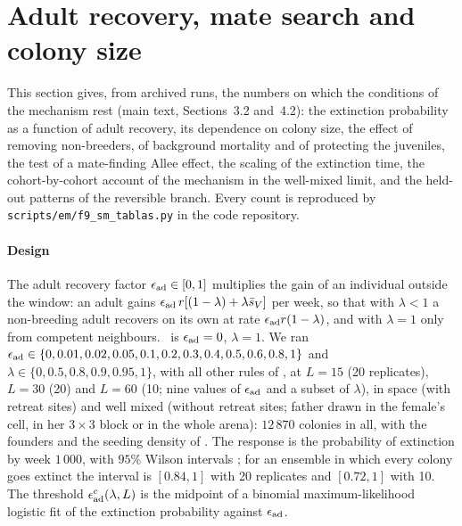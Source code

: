 \section{Adult recovery, mate search and colony size}
\label{supp:recovery}\label{sec:recovery}

This section gives, from archived runs, the numbers on which the
conditions of the mechanism rest (main text, Sections~3.2 and~4.2): the extinction probability as a function of adult
recovery, its dependence on colony size, the effect of removing non-breeders, of background mortality and of
protecting the juveniles, the test of a mate-finding Allee effect, the scaling of the extinction
time, the cohort-by-cohort account of the mechanism in the well-mixed limit, and the held-out patterns of the
reversible branch. Every count is reproduced by
\texttt{scripts/em/f9\_sm\_tablas.py} in the code repository.

\paragraph{Design}
The adult recovery factor $\epsilon_{\rm ad}\in[0,1]$ multiplies the gain of an individual outside the window: an adult gains
$\epsilon_{\rm ad}\,r[(1-\lambda)+\lambda\bar s_V]$ per week, so that with $\lambda<1$ a non-breeding adult recovers on its own
at rate $\epsilon_{\rm ad} r(1-\lambda)$, and with $\lambda=1$ only from competent neighbours. \Cone\ is $\epsilon_{\rm ad}=0$, $\lambda=1$.
We ran $\epsilon_{\rm ad}\in\{0,0.01,0.02,0.05,0.1,0.2,0.3,0.4,0.5,0.6,0.8,1\}$ and $\lambda\in\{0,0.5,0.8,0.9,0.95,1\}$, with
all other rules of \Cone, at $L=15$ (20 replicates), $L=30$ (20) and $L=60$ (10; nine values of $\epsilon_{\rm ad}$ and a
subset of $\lambda$), in space (with retreat sites) and well mixed (without retreat sites; father drawn in the
female's cell, in her $3\times3$ block or in the whole arena): $12\,870$ colonies in all, with the founders and the
seeding density of \Cone. The response is the probability of extinction by week $1\,000$, with $95\%$ Wilson
intervals \citep{Wilson1927}; for an ensemble in which every colony goes extinct the interval is $[0.84,1]$ with 20
replicates and $[0.72,1]$ with 10. The threshold $\epsilon_{\rm ad}^c(\lambda,L)$ is the midpoint of a binomial
maximum-likelihood logistic fit of the extinction probability against $\epsilon_{\rm ad}$.

